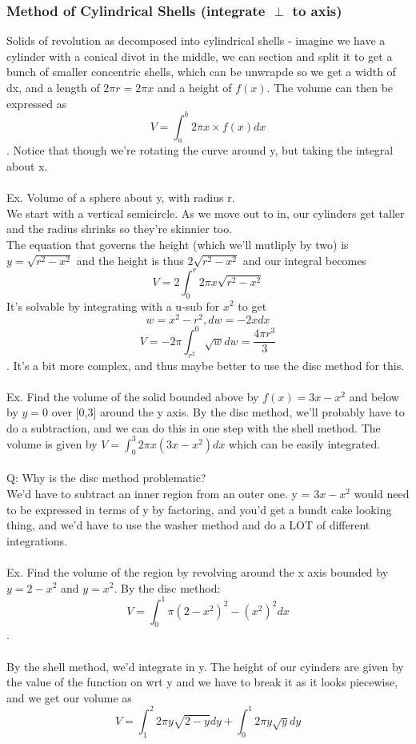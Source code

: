 \documentclass[twocolumn, 12pt]{report}
\begin{document}
\subsubsection{Method of Cylindrical Shells (integrate $\perp$ to axis)}
Solids of revolution as decomposed into cylindrical shells - imagine we have a cylinder with a conical divot in the middle, we can section and split it to get a bunch of smaller concentric shells, which can be unwrapde so we get a width of dx, and a length of $2\pi r = 2\pi x$ and a height of $f(x)$. The volume can then be expressed as $$V = \int_a^b 2\pi x\times f(x) dx$$. Notice that though we're rotating the curve around y, but taking the integral about x.\\\\
Ex. Volume of a sphere about y, with radius r.\\ We start with a vertical semicircle. As we move out to in, our cylinders get taller and the radius shrinks so they're skinnier too. \\ The equation that governs the height (which we'll mutliply by two) is $y= \sqrt{r^2 - x^2}$ and the height is thus $2\sqrt{r^2 - x^2}$ and our integral becomes  $$V = 2\int_0^r 2\pi x \sqrt{r^2 - x^2}$$ It's solvable by integrating with a u-sub for $x^2$ to get $$w = x^2 - r^2, dw = -2xdx$$ $$V = -2\pi\int_{r^2}^0\sqrt{w}dw = \frac{4\pi r^3}{3}$$. It's a bit more complex, and thus maybe better to use the disc method for this. \\\\
Ex. Find the volume of the solid bounded above by $f(x) = 3x - x^2$ and below by $y= 0$ over [0,3] around the y axis. By the disc method, we'll probably have to do a subtraction, and we can do this in one step with the shell method. The volume is given by $V = \int_0^3 2\pi x(3x - x^2)dx$ which can be easily integrated. \\ \\Q: Why is the disc method problematic? \\ We'd have to subtract an inner region from an outer one. y = $3x - x^2$ would need to be expressed in terms of y by factoring, and you'd get a bundt cake looking thing, and we'd have to use the washer method and do a LOT of different integrations.\\\\
Ex. Find the volume of the region by revolving around the x axis bounded by $y = 2-x^2$ and $y= x^2$. By the disc method: $$V = \int_0^1 \pi (2-x^2)^2 - (x^2)^2 dx$$. \\\\ By the shell method, we'd integrate in y. The height of our cyinders are given by the value of the function on wrt y and we have to break it as it looks piecewise, and we get our volume as $$V =\int_1^2 2\pi y \sqrt{2-y}dy + \int_0^1 2\pi y \sqrt y dy$$\\\\
\end{document}
